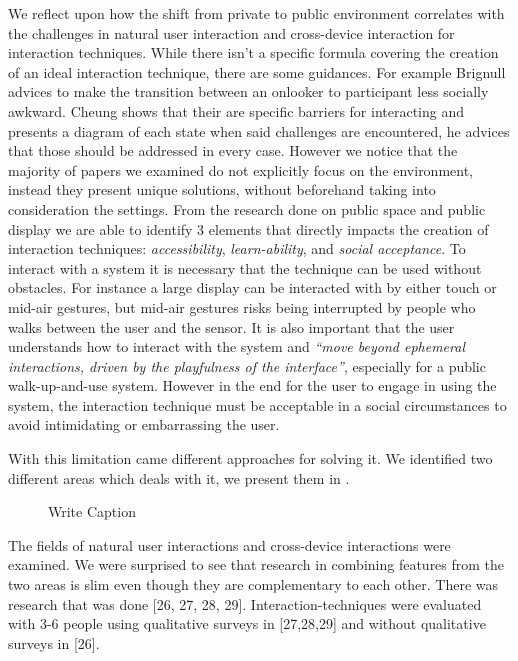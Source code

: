 We reflect upon how the shift from private to public environment correlates with the challenges in natural user interaction and cross-device interaction for interaction techniques.
While there isn't a specific formula covering the creation of an ideal interaction technique, there are some guidances. For example Brignull advices to make the transition between an onlooker to participant less socially awkward. Cheung shows that their are specific barriers for interacting and presents a diagram of each state when said challenges are encountered, he advices that those should be addressed in every case. However we notice that the majority of papers we examined do not explicitly focus on the environment, instead they present unique solutions, without beforehand taking into consideration the settings.
From the research done on public space and public display we are able to identify 3 elements that directly impacts the creation of interaction techniques: \emph{accessibility}, \emph{learn-ability}, and \emph{social acceptance}. To interact with a system it is necessary that the technique can be used without obstacles. For instance a large display can be interacted with by either touch or mid-air gestures, but mid-air gestures risks being interrupted by people who walks between the user and the sensor. It is also important that the user understands how to interact with the system and \emph{``move beyond ephemeral interactions, driven by the playfulness of the interface''}\cite{Jacucci:2010}, especially for a public walk-up-and-use system. However in the end for the user to engage in using the system, the interaction technique must be acceptable in a social circumstances to avoid intimidating or embarrassing the user. 

With this limitation came different approaches for solving it. 
We identified two different areas which deals with it, we present them in .
\begin{figure}[h!]
\centering
{}
\caption{Write Caption}
\label{fig:litreview}
\end{figure}
The fields of natural user interactions and cross-device interactions were examined. 
We were surprised to see that research in combining features from the two areas is slim even though they are complementary to each other. 
There was research that was done [26, 27, 28, 29]. 
Interaction-techniques were evaluated with 3-6 people using qualitative surveys in [27,28,29] and without qualitative surveys in [26].\\

